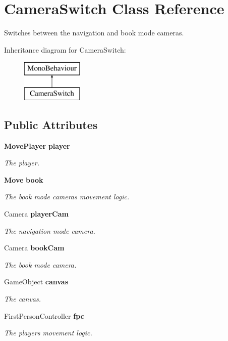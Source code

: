 \section{Camera\+Switch Class Reference}
\label{class_camera_switch}


Switches between the navigation and book mode cameras.  


Inheritance diagram for Camera\+Switch\+:\begin{figure}[H]
\begin{center}
\leavevmode
\includegraphics[height=2.000000cm]{class_camera_switch}
\end{center}
\end{figure}
\subsection*{Public Attributes}
\begin{DoxyCompactItemize}
\item 
{\bf Move\+Player} {\bf player}
\begin{DoxyCompactList}\small\item\em The player. \end{DoxyCompactList}\item 
{\bf Move} {\bf book}
\begin{DoxyCompactList}\small\item\em The book mode camera\textquotesingle{}s movement logic. \end{DoxyCompactList}\item 
Camera {\bf player\+Cam}
\begin{DoxyCompactList}\small\item\em The navigation mode camera. \end{DoxyCompactList}\item 
Camera {\bf book\+Cam}
\begin{DoxyCompactList}\small\item\em The book mode camera. \end{DoxyCompactList}\item 
Game\+Object {\bf canvas}
\begin{DoxyCompactList}\small\item\em The canvas. \end{DoxyCompactList}\item 
First\+Person\+Controller {\bf fpc}
\begin{DoxyCompactList}\small\item\em The player\textquotesingle{}s movement logic. \end{DoxyCompactList}\end{DoxyCompactItemize}


